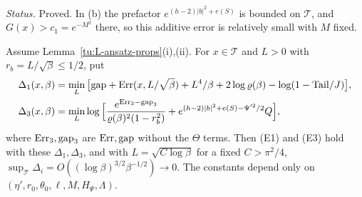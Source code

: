 \noindent\emph{Status.} Proved. In (b) the prefactor $e^{(h-2)|b|^2+e(S)}$ is bounded on $\mathcal T$, and
$G(x)>c_1=e^{-M^2}$ there, so this additive error is relatively small with $M$ fixed.

\begin{proposition}[(E1) and (E3)]\label{tu:L-E13}
Assume Lemma~\ref{tu:L-ansatz-props}(i),(ii). For $x\in\mathcal T$ and $L>0$ with $r_b=L/\sqrt\beta\le1/2$, put
\begin{align*}
\Delta_1(x,\beta)&=\min_L\big[{\rm gap}+{\rm Err}(x,L/\sqrt\beta)+L^4/\beta+2\log\varrho(\beta)-\log(1-{\rm Tail}/J)\big],\\
\Delta_3(x,\beta)&=\min_L\log\Big[\frac{e^{{\rm Err}_3-{\rm gap}_3}}{\varrho(\beta)^2(1-r_b^2)}+e^{(h-2)|b|^2+e(S)-\Psi'^2/2}Q\Big],
\end{align*}
where ${\rm Err}_3,{\rm gap}_3$ are ${\rm Err},{\rm gap}$ without the $\Theta$ terms. Then (E1) and (E3) hold
with these $\Delta_1,\Delta_3$, and with $L=\sqrt{C\log\beta}$ for a fixed $C>\pi^2/4$,
$\sup_{\mathcal T}\Delta_i=O((\log\beta)^{3/2}\beta^{-1/2})\to0$. The constants depend only on
$(\eta',r_0,\theta_0,\ell,M,H_\Psi,\Lambda)$.
\end{proposition}


